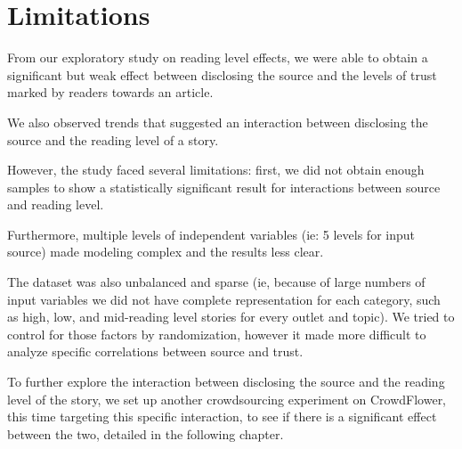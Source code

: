 \section{Limitations}

From our exploratory study on reading level effects, we were able to obtain a significant but weak effect between disclosing the source and the levels of trust marked by readers towards an article.

We also observed trends that suggested an interaction between disclosing the source and the reading level of a story.

However, the study faced several limitations: first, we did not obtain enough samples to show a statistically significant result for interactions between source and reading level.

Furthermore, multiple levels of independent variables (ie: 5 levels for input source) made modeling complex and the results less clear.

The dataset was also unbalanced and sparse (ie, because of large numbers of input variables we did not have complete representation for each category, such as high, low, and mid-reading level stories for every outlet and topic). We tried to control for those factors by randomization, however it made more difficult to analyze specific correlations between source and trust.

To further explore the interaction between disclosing the source and the reading level of the story, we set up another crowdsourcing experiment on CrowdFlower, this time targeting this specific interaction, to see if there is a significant effect between the two, detailed in the following chapter.
